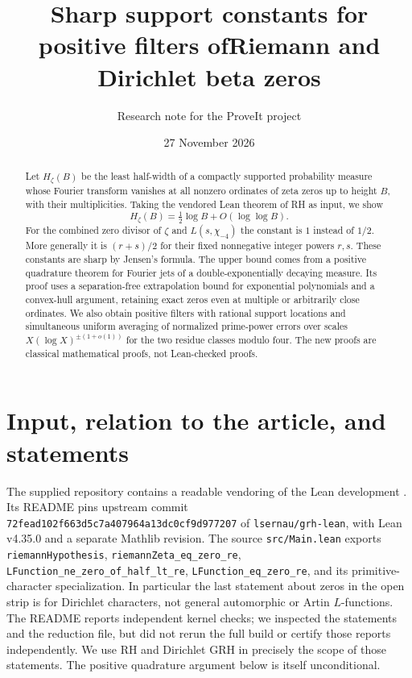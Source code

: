 \documentclass[11pt]{article}
\title{Sharp support constants for positive filters of\newline Riemann and Dirichlet beta zeros}
\author{Research note for the ProveIt project}
\date{27 November 2026}
\theoremstyle{remark}\newtheorem{remark}[theorem]{Remark}
\begin{document}
\maketitle
\begin{abstract}
Let $H_\zeta(B)$ be the least half-width of a compactly supported probability measure whose Fourier transform vanishes at all nonzero ordinates of zeta zeros up to height $B$, with their multiplicities. Taking the vendored Lean theorem of RH as input, we show
\[H_\zeta(B)=\tfrac12\log B+O(\log\log B).\]
For the combined zero divisor of $\zeta$ and $L(s,\chi_{-4})$ the constant is $1$ instead of $1/2$. More generally it is $(r+s)/2$ for their fixed nonnegative integer powers $r,s$. These constants are sharp by Jensen's formula. The upper bound comes from a positive quadrature theorem for Fourier jets of a double-exponentially decaying measure. Its proof uses a separation-free extrapolation bound for exponential polynomials and a convex-hull argument, retaining exact zeros even at multiple or arbitrarily close ordinates. We also obtain positive filters with rational support locations and simultaneous uniform averaging of normalized prime-power errors over scales $X(\log X)^{\pm(1+o(1))}$ for the two residue classes modulo four. The new proofs are classical mathematical proofs, not Lean-checked proofs.
\end{abstract}

\section{Input, relation to the article, and statements}
The supplied repository contains a readable vendoring of the Lean development \cite{vendor,leanmain,leanstatements}. Its README pins upstream commit \texttt{72fead102f663d5c7a407964a13dc0cf9d977207} of \texttt{lsernau/grh-lean}, with Lean v4.35.0 and a separate Mathlib revision. The source \texttt{src/Main.lean} exports \texttt{riemannHypothesis}, \texttt{riemannZeta\_eq\_zero\_re}, \texttt{LFunction\_ne\_zero\_of\_}\allowbreak\texttt{half\_lt\_re}, \texttt{LFunction\_eq\_zero\_re}, and its primitive-character specialization. In particular the last statement about zeros in the open strip is for Dirichlet characters, not general automorphic or Artin $L$-functions. The README reports independent kernel checks; we inspected the statements and the reduction file, but did not rerun the full build or certify those reports independently. We use RH and Dirichlet GRH in precisely the scope of those statements. The positive quadrature argument below is itself unconditional.
\end{document}
